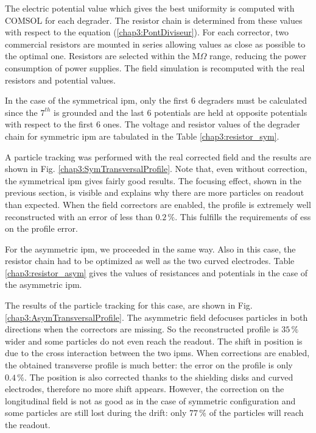 \begin{refsection}
  The electric potential value which gives the best uniformity is computed with COMSOL for each degrader. The resistor chain is determined from these values with respect to the equation (\ref{chap3:PontDiviseur}). For each corrector, two commercial resistors are mounted in series allowing values as close as possible to the optimal one. Resistors are selected within the $\mathrm{M}\Omega $ range, reducing the power consumption of power supplies. The field simulation is recomputed with the real resistors and potential values.

  In the case of the symmetrical \acrshort{ipm}, only the first $6$ degraders must be calculated since the $7^{th}$ is grounded and the last $6$ potentials are held at opposite potentials with respect to  the first 6 ones. The voltage and resistor values of the degrader chain for symmetric \acrshort{ipm} are tabulated in the Table \ref{chap3:resistor_sym}.

  
  

  A particle tracking was performed with the real corrected field and the results are shown in Fig. \ref{chap3:SymTransversalProfile}. Note that, even without correction, the symmetrical \acrshort{ipm} gives fairly good results. The focusing effect, shown in the previous section, is visible and explains why there are more particles on readout than expected. When the field correctors are enabled, the profile is extremely well reconstructed with an error of less than $0.2\,\mathrm{\%}$.  This fulfills the requirements of \acrshort{ess} on the profile error.

  
  For the asymmetric \acrshort{ipm}, we proceeded in the same way. Also in this case, the resistor chain had to be optimized as well as the two curved electrodes. Table \ref{chap3:resistor_asym} gives the values of resistances and potentials in the case of the asymmetric \acrshort{ipm}.

  
  

  The results of the particle tracking for this case, are shown in Fig. \ref{chap3:AsymTransversalProfile}. The asymmetric field defocuses particles in both directions when the correctors are missing. So the reconstructed profile is $35\,\mathrm{\%}$ wider and some particles do not even reach the readout. The shift in position is due to the cross interaction between the two \acrshort{ipm}s. When corrections are enabled, the obtained transverse profile is much better: the error on the profile is only $0.4\,\mathrm{\%}$. The position is also corrected thanks to the shielding disks and curved electrodes, therefore no more shift appears. However, the correction on the longitudinal field is not as good as in the case of symmetric configuration and some particles are still lost during the drift: only $77\,\mathrm{\%}$ of the particles will reach the readout.



\end{refsection}
